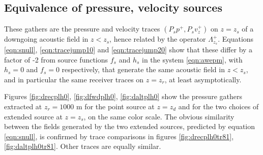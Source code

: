 \subsection{Equivalence of pressure, velocity sources}
These gathers are the pressure and
velocity traces
$(P_sp^+,P_sv^+_z)$ on $z=z_s$ of a downgoing acoustic field in
$z<z_s$, hence related by the operator $\Lambda^+_{z_s}$.
Equations \ref{eqn:snull}, \ref{eqn:tracejump10} and
\ref{eqn:tracejump20} show that these differ by a factor of -2 from
source functions $f_s$ and $h_s$ in the system \ref{eqn:awepm},
with $h_s=0$ and $f_s=0$ respectively, that generate the same acoustic
field in $z<z_s$, and in particular the same receiver traces on
$z=z_r$, at least asymptotically.


Figures
\ref{fig:drecplh0}, \ref{fig:dfwdplh0}, \ref{fig:daltplh0} show the pressure
gathers extracted at $z_r=1000$ m for the point source at $z=z_d$ and
for the two choices of extended source at $z=z_s$, on the same color
scale. The obvious similarity between the fields generated by the two
extended sources,
predicted by equation \ref{eqn:snull}, is confirmed by trace
comparisons in figures %
\ref{fig:drecplh0tr81},\ref{fig:daltplh0tr81}. Other traces are
equally similar.




